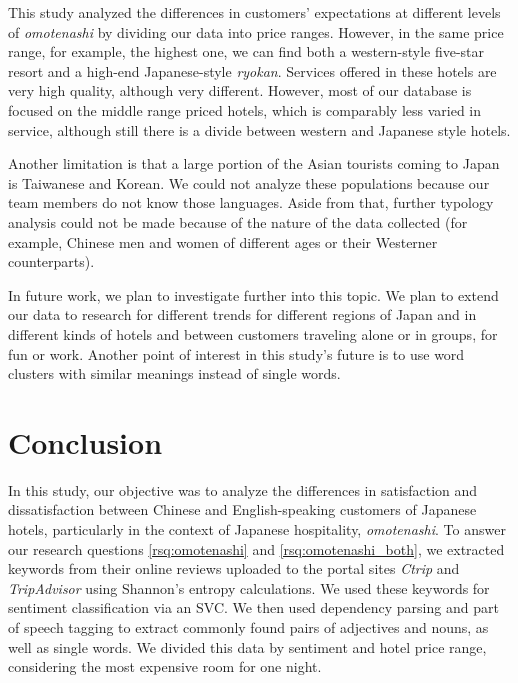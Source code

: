 \documentclass[smallextended,natbib]{svjour3}       %
\begin{document}
  This study analyzed the differences in customers' expectations at different levels of \textit{omotenashi} by dividing our data into price ranges. However, in the same price range, for example, the highest one, we can find both a western-style five-star resort and a high-end Japanese-style \textit{ryokan}. Services offered in these hotels are very high quality, although very different. However, most of our database is focused on the middle range priced hotels, which is comparably less varied in service, although still there is a divide between western and Japanese style hotels.

  Another limitation is that a large portion of the Asian tourists coming to Japan is Taiwanese and Korean. We could not analyze these populations because our team members do not know those languages. Aside from that, further typology analysis could not be made because of the nature of the data collected (for example, Chinese men and women of different ages or their Westerner counterparts).

  In future work, we plan to investigate further into this topic. We plan to extend our data to research for different trends for different regions of Japan and in different kinds of hotels and between customers traveling alone or in groups, for fun or work. Another point of interest in this study's future is to use word clusters with similar meanings instead of single words. 

\section{Conclusion}\label{conclusion}

  In this study, our objective was to analyze the differences in satisfaction and dissatisfaction between Chinese and English-speaking customers of Japanese hotels, particularly in the context of Japanese hospitality, \textit{omotenashi}. To answer our research questions \ref{rsq:omotenashi} and \ref{rsq:omotenashi_both}, we extracted keywords from their online reviews uploaded to the portal sites \textit{Ctrip} and \textit{TripAdvisor} using Shannon's entropy calculations. We used these keywords for sentiment classification via an SVC. We then used dependency parsing and part of speech tagging to extract commonly found pairs of adjectives and nouns, as well as single words. We divided this data by sentiment and hotel price range, considering the most expensive room for one night. 
\end{document}
